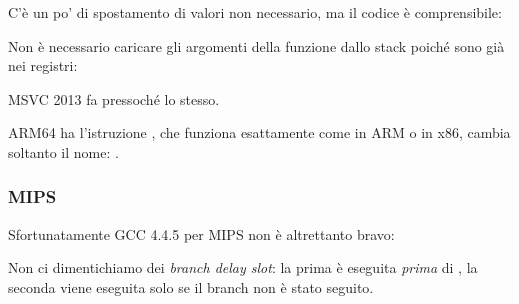 

C'è un po' di spostamento di valori non necessario, ma il codice è comprensibile:




Non è necessario caricare gli argomenti della funzione dallo stack poiché sono già nei registri:



MSVC 2013 fa pressoché lo stesso.


ARM64 ha l'istruzione , che funziona esattamente come  in ARM o  in x86, cambia soltanto il nome:
.



\subsubsection{MIPS}

Sfortunatamente GCC 4.4.5 per MIPS non è altrettanto bravo:



Non ci dimentichiamo dei \emph{branch delay slot}: la prima  è eseguita \emph{prima} di , 
la seconda  viene eseguita solo se il branch non è stato seguito.

